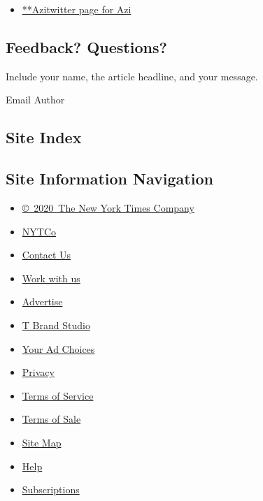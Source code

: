 \begin{itemize}
\tightlist
\item
  \href{https://twitter.com/Azi}{**Azitwitter page for Azi}
\end{itemize}

\hypertarget{feedback-questions}{%
\subsection{Feedback? Questions?}\label{feedback-questions}}

Include your name, the article headline, and your message.

Email Author

\hypertarget{site-index}{%
\subsection{Site Index}\label{site-index}}

\hypertarget{site-information-navigation}{%
\subsection{Site Information
Navigation}\label{site-information-navigation}}

\begin{itemize}
\tightlist
\item
  \href{https://help.nytimes3xbfgragh.onion/hc/en-us/articles/115014792127-Copyright-notice}{©~2020~The
  New York Times Company}
\end{itemize}

\begin{itemize}
\tightlist
\item
  \href{https://www.nytco.com/}{NYTCo}
\item
  \href{https://help.nytimes3xbfgragh.onion/hc/en-us/articles/115015385887-Contact-Us}{Contact
  Us}
\item
  \href{https://www.nytco.com/careers/}{Work with us}
\item
  \href{https://nytmediakit.com/}{Advertise}
\item
  \href{http://www.tbrandstudio.com/}{T Brand Studio}
\item
  \href{https://www.nytimes3xbfgragh.onion/privacy/cookie-policy\#how-do-i-manage-trackers}{Your
  Ad Choices}
\item
  \href{https://www.nytimes3xbfgragh.onion/privacy}{Privacy}
\item
  \href{https://help.nytimes3xbfgragh.onion/hc/en-us/articles/115014893428-Terms-of-service}{Terms
  of Service}
\item
  \href{https://help.nytimes3xbfgragh.onion/hc/en-us/articles/115014893968-Terms-of-sale}{Terms
  of Sale}
\item
  \href{https://spiderbites.nytimes3xbfgragh.onion}{Site Map}
\item
  \href{https://help.nytimes3xbfgragh.onion/hc/en-us}{Help}
\item
  \href{https://www.nytimes3xbfgragh.onion/subscription?campaignId=37WXW}{Subscriptions}
\end{itemize}
